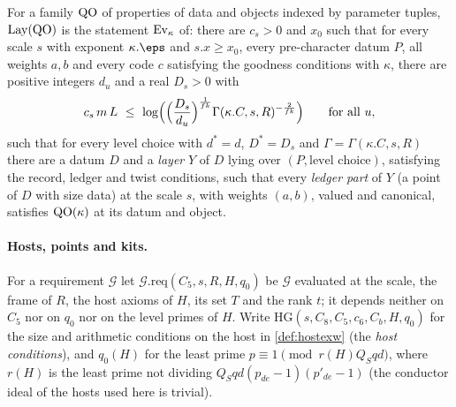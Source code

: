 \begin{definition}\label{pf:stageU:recexpdef}
For a family $\mathrm{QO}$ of properties of data and objects indexed by parameter tuples, $\mathrm{Lay}(\mathrm{QO})$ is the
statement $\mathrm{Ev}_\kappa$ of: there are $c_s>0$ and $x_0$ such that for every scale $s$ with exponent $\kappa.\eps$ and
$s.x\ge x_0$, every pre-character datum $P$, all weights $a,b$ and every code $c$ satisfying the goodness conditions with
$\kappa$, there are positive integers $d_u$ and a real $D_s>0$ with
\begin{equation}\label{pf:stageU:eq:recexp}
c_s\,m\,L\ \le\ \log\Bigl(\Bigl(\frac{D_s}{d_u}\Bigr)^{\frac1{fk}}\Gamma(\kappa.C,s,R)^{-\frac2{fk}}\Bigr)\qquad\text{for all }u,
\end{equation}
such that for every level choice with $d^*=d$, $D^*=D_s$ and $\Gamma=\Gamma(\kappa.C,s,R)$ there are a datum $D$ and a
\emph{layer} $Y$ of $D$ lying over $(P,\text{level choice})$, satisfying the record, ledger and twist conditions, such that
every \emph{ledger part} of $Y$ (a point of $D$ with size data) at the scale $s$, with weights $(a,b)$, valued and
canonical, satisfies $\mathrm{QO}(\kappa)$ at its datum and object.
\end{definition}

\paragraph{Hosts, points and kits.}
For a requirement $\mathcal G$ let $\mathcal G.\mathrm{req}(C_5,s,R,H,q_0)$ be $\mathcal G$ evaluated at the scale, the frame of
$R$, the host axioms of $H$, its set $T$ and the rank $t$; it depends neither on $C_5$ nor on $q_0$ nor on the level primes
of $H$. Write $\mathrm{HG}(s,C_8,C_5,c_6,C_b,H,q_0)$ for the size and arithmetic conditions on the host in
\cref{def:hostexw} (the \emph{host conditions}), and $q_0(H)$ for the least prime $p\equiv1\pmod{r(H)Q_Sqd}$, where $r(H)$
is the least prime not dividing $Q_Sqd(p_{de}-1)(p'_{de}-1)$ (the conductor ideal of the hosts used here is trivial).

